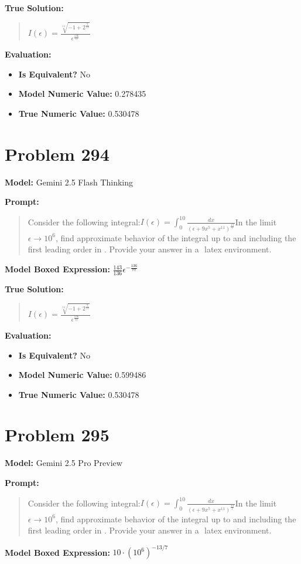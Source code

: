 \documentclass{article}
\begin{document}
{\textbf{True Solution:}
\begin{quote}
$I(\epsilon) = \frac{\sqrt[11]{-1 + 2^{\frac{7}{13}}}}{\epsilon^{\frac{136}{77}}}$
\end{quote}

\textbf{Evaluation:}
\begin{itemize}
\item \textbf{Is Equivalent?} No
\item \textbf{Model Numeric Value:} 0.278435
\item \textbf{True Numeric Value:} 0.530478
\end{itemize}
\vspace{1cm}
\section*{Problem 294}
\textbf{Model:} Gemini 2.5 Flash Thinking

\textbf{Prompt:}
\begin{quote}
Consider the following integral:$I(\epsilon) = \int_0^{10} \frac{dx}{(\epsilon + 9x^5 + x^{11})^\frac{13}{7}}$In the limit$\epsilon \to 10^6$, find approximate behavior of the integral up to and including the first leading order in \epsilon. Provide your answer in a $\boxed{}$ latex environment.
\end{quote}
\textbf{Model Boxed Expression:} $\frac{143}{136}\epsilon^{-\frac{136}{77}}$

\textbf{True Solution:}
\begin{quote}
$I(\epsilon) = \frac{\sqrt[11]{-1 + 2^{\frac{7}{13}}}}{\epsilon^{\frac{136}{77}}}$
\end{quote}

\textbf{Evaluation:}
\begin{itemize}
\item \textbf{Is Equivalent?} No
\item \textbf{Model Numeric Value:} 0.599486
\item \textbf{True Numeric Value:} 0.530478
\end{itemize}
\vspace{1cm}
\section*{Problem 295}
\textbf{Model:} Gemini 2.5 Pro Preview

\textbf{Prompt:}
\begin{quote}
Consider the following integral:$I(\epsilon) = \int_0^{10} \frac{dx}{(\epsilon + 9x^5 + x^{11})^\frac{13}{7}}$In the limit$\epsilon \to 10^6$, find approximate behavior of the integral up to and including the first leading order in \epsilon. Provide your answer in a $\boxed{}$ latex environment.
\end{quote}
\textbf{Model Boxed Expression:} $10 \cdot (10^6)^{-13/7}$

}
\end{document}
